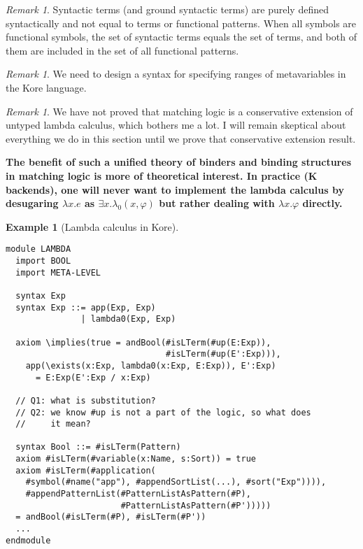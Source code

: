 \documentclass[UTF8]{article}
\newcommand{\comment}[1]
    {\par {\bfseries \color{blue} #1 \par}} %
\newcounter{thmcounter}
\theoremstyle{plain}
\theoremstyle{definition}
\newtheorem{example}[thmcounter]{Example}
\theoremstyle{remark}
\newtheorem{remark}[thmcounter]{Remark}
\begin{document}
\begin{remark}
Syntactic terms (and ground syntactic terms) are purely defined syntactically and not equal to terms or functional patterns. When all symbols are functional symbols, the set of syntactic terms equals the set of terms, and both of them are included in the set of all functional patterns. 
\end{remark}

\begin{remark}
We need to design a syntax for specifying ranges of metavariables in the Kore language. 
\end{remark}

\begin{remark}
We have not proved that matching logic is a conservative extension of untyped lambda calculus, which bothers me a lot. I will remain skeptical about everything we do in this section until we prove that conservative extension result. 
\end{remark}

\comment{The benefit of such a unified theory of binders and binding structures in matching logic is more of theoretical interest. In practice (K backends), one will never want to implement the lambda calculus by desugaring $\lambda x . e$ as $\exists x . \lambda_0(x, \varphi)$ but rather dealing with $\lambda x . \varphi$ directly. }

\begin{example}[Lambda calculus in Kore]
\quad
\begin{Verbatim}[fontsize=\small]
module LAMBDA
  import BOOL
  import META-LEVEL
  
  syntax Exp
  syntax Exp ::= app(Exp, Exp)
               | lambda0(Exp, Exp)
  
  axiom \implies(true = andBool(#isLTerm(#up(E:Exp)),
                                #isLTerm(#up(E':Exp))), 
    app(\exists(x:Exp, lambda0(x:Exp, E:Exp)), E':Exp)
      = E:Exp(E':Exp / x:Exp)
  
  // Q1: what is substitution?
  // Q2: we know #up is not a part of the logic, so what does
  //     it mean?
  
  syntax Bool ::= #isLTerm(Pattern)
  axiom #isLTerm(#variable(x:Name, s:Sort)) = true
  axiom #isLTerm(#application(
    #symbol(#name("app"), #appendSortList(...), #sort("Exp")))),
    #appendPatternList(#PatternListAsPattern(#P),
                       #PatternListAsPattern(#P')))))
  = andBool(#isLTerm(#P), #isLTerm(#P'))
  ...
endmodule
\end{Verbatim}
\end{example}
\end{document}
